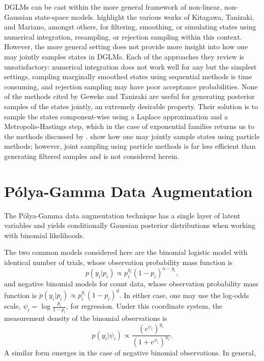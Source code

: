 \documentclass[11pt]{article}
\newcommand{\Polya}{P\'{o}lya}
\begin{document}
DGLMs can be cast within the more general framework of non-linear, non-Gaussian
state-space models.  \cite{geweke-tanizaki-2001} highlight the various works of
Kitagawa, Tanizaki, and Mariano, amongst others, for filtering, smoothing, or
simulating states using numerical integration, resampling, or rejection sampling
within this context.  However, the more general setting does not provide more
insight into how one may jointly samples states in DGLMs.  Each of the
approaches they review is unsatisfactory: numerical integration does not work
well for any but the simplest settings, sampling marginally smoothed states
using sequential methods is time consuming, and rejection sampling may have poor
acceptance probabilities.  None of the methods cited by Geweke and Tanizaki are
useful for generating posterior samples of the states jointly, an extremely
desirable property.  Their solution is to sample the states component-wise using
a Laplace approximation and a Metropolis-Hastings step, which in the case of
exponential families returns us to the methods discussed by
\citep{gamerman-1998}.  \cite{godsill-etal-2004} show how one may jointly sample
states using particle methods; however, joint sampling using particle methods is
far less efficient than generating filtered samples and is not considered
herein.

\section{\Polya-Gamma Data Augmentation}

The \Polya-Gamma data augmentation technique \citep{polson-etal-2013} has a
single layer of latent variables and yields conditionally Gaussian posterior
distributions when working with binomial likelihoods. 

The two common models
considered here are the binomial logistic model with identical number of trials,
whose observation probability mass function is
\[
p(y_i | p_i) \propto p_i^{y_i} (1-p_i)^{n - y_i},
\]
and negative binomial models for count data, whose observation probability mass
function is \( p(y_i | p_i) \propto p_i^{y_i} (1-p_i)^{d}.  \) In either case,
one may use the log-odds scale, $\psi_i = \log \frac{p_i}{1-p_i}$, for
regression.  Under this coordinate system, the measurement density of the
binomial observations is
\[
p(y_i | \psi_i) \propto \frac{(e^{\psi_i})^{y_i}}{(1+e^{\psi_i})^{n_i}}.
\]
A similar form emerges in the case of negative binomial observations.  In
general, 
\end{document}
